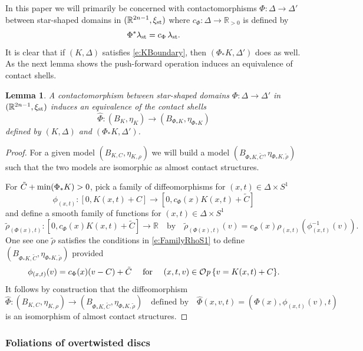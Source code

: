 \documentclass[12pt]{paper}
\theoremstyle{plain}
\newtheorem{lemma}[theorem]{Lemma}
\theoremstyle{definition}
\newcommand{\wh}{\widehat}
\newcommand{\R}{{\mathbb{R}}}
\newcommand{\st}{{\rm st}}
\renewcommand{\min}{{\rm min}}
\def\Op{{\mathcal O}{\it p}\,}
\numberwithin{figure}{section}
\begin{document}
In this paper we will primarily be concerned with contactomorphisms $\Phi: \Delta \to \Delta'$ between star-shaped domains
in $(\R^{2n-1}, \xi_{\st})$ where $c_\Phi: \Delta \to \R_{>0}$ is defined by
$$
	\Phi^*\lambda_{\st} = c_\Phi\,\lambda_{\st}.
$$
It is clear that if $(K, \Delta)$ satisfies \eqref{e:KBoundary}, then $(\Phi_*K, \Delta')$ does as well.  As the next lemma shows
the push-forward operation induces an equivalence of contact shells.

\begin{lemma}\label{l:PhiToTildePhi}
A contactomorphism between star-shaped domains $\Phi: \Delta \to \Delta'$ in $(\R^{2n-1}, \xi_{\st})$
induces an equivalence of the contact shells
$$
	\wh\Phi: (B_{K}, \eta_{K}) \to (B_{\Phi_*K}, \eta_{\Phi_*K})
$$
defined by $(K, \Delta)$ and $(\Phi_*K, \Delta')$.
\end{lemma}
\begin{proof}
	For a given model $(B_{K,C}, \eta_{K, \rho})$ we will build a model $(B_{\Phi_*K,\tilde{C}}, \eta_{\Phi_*K, \tilde{\rho}})$
	such that the two models are isomorphic as almost contact structures.
	
	For $\tilde{C} + \min(\Phi_*K) > 0$, pick a family of diffeomorphisms for $(x,t) \in \Delta \times S^1$
	$$
		\phi_{(x,t)}: [0, K(x,t)+C] \to [0, c_{\Phi}(x)K(x,t) + \tilde{C}] 
	$$
	and define a smooth family of functions for $(x, t) \in \Delta \times S^1$ 
	$$
		\tilde{\rho}_{(\Phi(x), t)}: [0, c_{\Phi}(x)K(x,t) + \tilde{C}] \to \R \quad
		\mbox{by}\quad
		\tilde{\rho}_{(\Phi(x), t)}(v) = c_\Phi(x) \rho_{(x,t)}(\phi_{(x,t)}^{-1}(v)).
	$$
	One see one $\tilde{\rho}$ satisfies the conditions in \eqref{e:FamilyRhoS1} to define
	$(B_{\Phi_*K, \tilde{C}}, \eta_{\Phi_*K, \tilde{\rho}})$ provided
	$$
	\mbox{$\phi_{(x,t)}(v) = c_{\Phi}(x)(v - C)+ \tilde{C}$ \quad for \quad $(x,t,v) \in \Op\{v = K(x,t) +C\}$.}
	$$
	It follows by construction that the diffeomorphism
	$$
	\wh\Phi: (B_{K,C}, \eta_{K,\rho}) \to (B_{\Phi_*K, \tilde{C}}, \eta_{\Phi_*K,\tilde{\rho}})
	\quad\mbox{defined by}\quad
	\wh\Phi(x,v,t) = (\Phi(x), \phi_{(x,t)}(v), t)
	$$
	is an isomorphism of almost contact structures.
\end{proof}

\subsubsection{Foliations of overtwisted discs}
\end{document}

